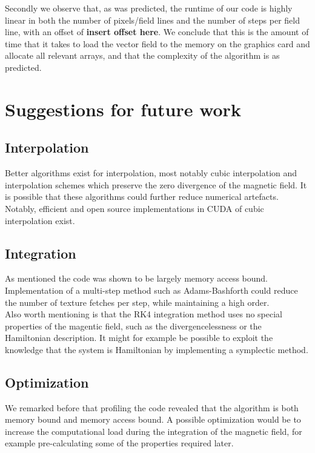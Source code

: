 \documentclass{article}
\begin{document}
Secondly we observe that, as was predicted, the runtime of our code is highly linear in both the number of pixels/field lines and the number of steps per field line, with an offset of \textbf{insert offset here}. We conclude that this is the amount of time that it takes to load the vector field to the memory on the graphics card and allocate all relevant arrays, and that the complexity of the algorithm is as predicted.

\section{Suggestions for future work}

\subsection{Interpolation}
Better algorithms exist for interpolation, most notably cubic interpolation and interpolation schemes which preserve the zero divergence of the magnetic field\cite{McNally01052011}. It is possible that these algorithms could further reduce numerical artefacts. %
Notably, efficient and open source implementations in CUDA of cubic interpolation exist.\cite{Ruijters01012012}

\subsection{Integration}
As mentioned the code was shown to be largely memory access bound. Implementation of a multi-step method such as Adams-Bashforth could reduce the number of texture fetches per step, while maintaining a high order.\\
Also worth mentioning is that the RK4 integration method uses no special properties of the magentic field, such as the divergencelessness or the Hamiltonian description. It might for example be possible to exploit the knowledge that the system is Hamiltonian by implementing a symplectic method.

\subsection{Optimization}
We remarked before that profiling the code revealed that the algorithm is both memory bound and memory access bound. A possible optimization would be to increase the computational load during the integration of the magnetic field, for example pre-calculating some of the properties required later.





\end{document}

